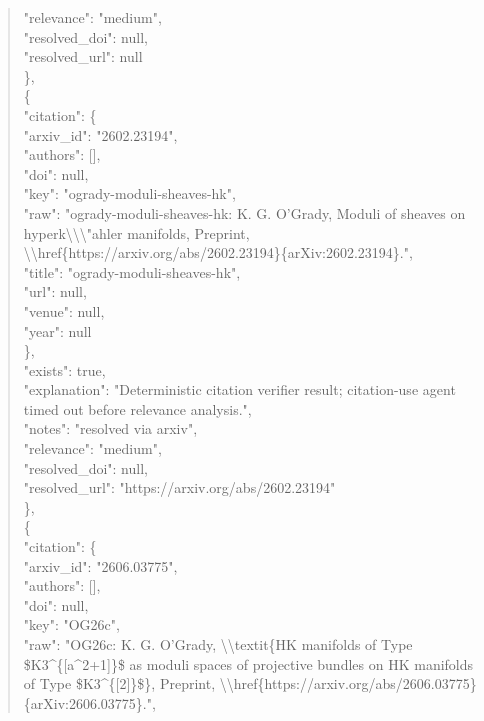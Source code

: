 \documentclass[11pt]{article}
\begin{document}
\begin{quote}
      "relevance": "medium",\\
      "resolved\_doi": null,\\
      "resolved\_url": null\\
    \},\\
    \{\\
      "citation": \{\\
        "arxiv\_id": "2602.23194",\\
        "authors": [],\\
        "doi": null,\\
        "key": "ogrady-moduli-sheaves-hk",\\
        "raw": "ogrady-moduli-sheaves-hk: K. G. O'Grady, Moduli of sheaves on hyperk\textbackslash{}\textbackslash{}\textbackslash{}"ahler manifolds, Preprint, \textbackslash{}\textbackslash{}href\{https://arxiv.org/abs/2602.23194\}\{arXiv:2602.23194\}.",\\
        "title": "ogrady-moduli-sheaves-hk",\\
        "url": null,\\
        "venue": null,\\
        "year": null\\
      \},\\
      "exists": true,\\
      "explanation": "Deterministic citation verifier result; citation-use agent timed out before relevance analysis.",\\
      "notes": "resolved via arxiv",\\
      "relevance": "medium",\\
      "resolved\_doi": null,\\
      "resolved\_url": "https://arxiv.org/abs/2602.23194"\\
    \},\\
    \{\\
      "citation": \{\\
        "arxiv\_id": "2606.03775",\\
        "authors": [],\\
        "doi": null,\\
        "key": "OG26c",\\
        "raw": "OG26c: K. G. O'Grady, \textbackslash{}\textbackslash{}textit\{HK manifolds of Type \$K3\^{}\{[a\^{}2+1]\}\$ as moduli spaces of projective bundles on HK manifolds of Type \$K3\^{}\{[2]\}\$\}, Preprint, \textbackslash{}\textbackslash{}href\{https://arxiv.org/abs/2606.03775\}\{arXiv:2606.03775\}.",\\

\end{quote}
\end{document}
